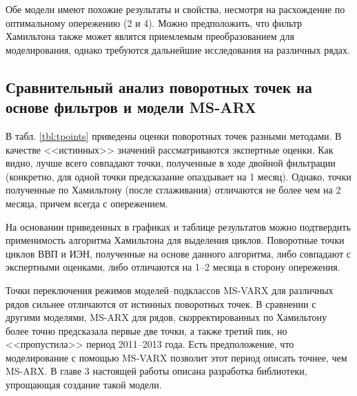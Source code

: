 \documentclass[a4paper,14pt]{extreport}
\begin{document}
	
	Обе модели имеют похожие результаты и свойства, несмотря на расхождение по оптимальному опережению (2 и 4). Можно предположить, что фильтр Хамильтона также может являтся приемлемым преобразованием для моделирования, однако требуются дальнейшие исследования на различных рядах.
	
	
	\subsection{Сравнительный анализ поворотных точек на основе фильтров и модели MS-ARХ}
	
	
	В табл. \ref{tbl:tpoints} приведены оценки поворотных точек разными методами. В качестве <<истинных>> значений рассматриваются экспертные оценки. Как видно, лучше всего совпадают точки, полученные в ходе двойной фильтрации (конкретно, для одной точки предсказание опаздывает на 1 месяц). Однако, точки полученные по Хамильтону (после сглаживания) отличаются не более чем на 2 месяца, причем всегда с опережением.
	
	На основании приведенных в графиках и таблице результатов можно подтвердить применимость алгоритма Хамильтона для выделения циклов. Поворотные точки циклов ВВП и ИЭН, полученные на основе данного алгоритма, либо совпадают с экспертными оценками, либо отличаются на 1--2 месяца в сторону опережения.
	
	Точки переключения режимов моделей--подклассов MS-VARX для различных рядов сильнее отличаются от истинных поворотных точек. В сравнении с другими моделями, MS-ARX для рядов, скорректированных по Хамильтону более точно предсказала первые две точки, а также третий пик, но <<пропустила>> период 2011--2013 года. Есть предположение, что моделирование с помощью MS-VARX позволит этот период описать точнее, чем MS-ARX. В главе 3 настоящей работы описана разработка библиотеки, упрощающая создание такой модели.
	
	
	
\end{document}
